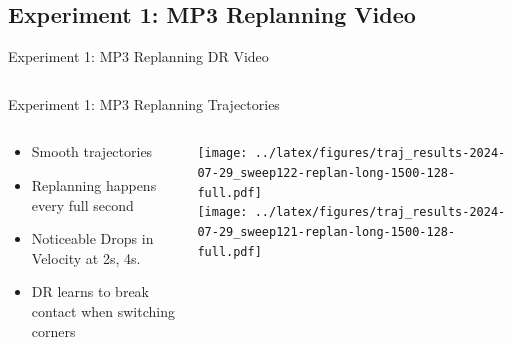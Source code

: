 \documentclass[16:9,en,navbarinfooter]{sdqbeamer}
\begin{document}
\subsection{Experiment 1: MP3 Replanning Video}
\begin{frame}{Experiment 1: MP3 Replanning DR Video}

	\begin{columns}[t]
		\vspace{1cm}



	\end{columns}
\end{frame}
\begin{frame}{Experiment 1: MP3 Replanning Trajectories}

	\begin{columns}[t]
		\begin{column}{0.3\textwidth}
			\vspace{1cm}
			\begin{itemize}
				\item Smooth trajectories
				\item Replanning happens every full second
				\item Noticeable Drops in Velocity at 2s, 4s.
				\item DR learns to break contact when switching corners
			\end{itemize}
		\end{column}
		\begin{column}{0.7\textwidth}
			\vspace{1cm}
			\texttt{[image: ../latex/figures/traj\_results-2024-07-29\_sweep122-replan-long-1500-128-full.pdf]} \\
			\texttt{[image: ../latex/figures/traj\_results-2024-07-29\_sweep121-replan-long-1500-128-full.pdf]} \\
		\end{column}
	\end{columns}
\end{frame}
\end{document}
